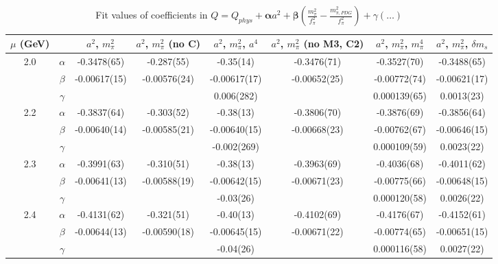 \documentclass[12pt]{extarticle}
\begin{document}
\begin{table}[h!]
\begin{center}
\begin{tabular}{|c c|c|c|c|c|c|c|}
\hline
$\mu$ (GeV) &  & $a^2$, $m_\pi^2$& $a^2$, $m_\pi^2$ (no C)& $a^2$, $m_\pi^2$, $a^4$& $a^2$, $m_\pi^2$ (no M3, C2)& $a^2$, $m_\pi^2$, $m_\pi^4$& $a^2$, $m_\pi^2$, $\delta m_s$\\
\hline
\multirow{3}{0.5in}{2.0} & $\alpha$ & -0.3478(65)& -0.287(55)& -0.35(14)& -0.3476(71)& -0.3527(70)& -0.3488(65)\\
 & $\beta$ & -0.00617(15)& -0.00576(24)& -0.00617(17)& -0.00652(25)& -0.00772(74)& -0.00621(17)\\
 & $\gamma$ &  &  & 0.006(282)&  & 0.000139(65)& 0.0013(23)\\
\hline
\multirow{3}{0.5in}{2.2} & $\alpha$ & -0.3837(64)& -0.303(52)& -0.38(13)& -0.3806(70)& -0.3876(69)& -0.3856(64)\\
 & $\beta$ & -0.00640(14)& -0.00585(21)& -0.00640(15)& -0.00668(23)& -0.00762(67)& -0.00646(15)\\
 & $\gamma$ &  &  & -0.002(269)&  & 0.000109(59)& 0.0023(22)\\
\hline
\multirow{3}{0.5in}{2.3} & $\alpha$ & -0.3991(63)& -0.310(51)& -0.38(13)& -0.3963(69)& -0.4036(68)& -0.4011(62)\\
 & $\beta$ & -0.00641(13)& -0.00588(19)& -0.00642(15)& -0.00671(23)& -0.00775(66)& -0.00648(15)\\
 & $\gamma$ &  &  & -0.03(26)&  & 0.000120(58)& 0.0026(22)\\
\hline
\multirow{3}{0.5in}{2.4} & $\alpha$ & -0.4131(62)& -0.321(51)& -0.40(13)& -0.4102(69)& -0.4176(67)& -0.4152(61)\\
 & $\beta$ & -0.00644(13)& -0.00590(18)& -0.00645(15)& -0.00671(22)& -0.00774(65)& -0.00651(15)\\
 & $\gamma$ &  &  & -0.04(26)&  & 0.000116(58)& 0.0027(22)\\
\hline
\end{tabular}
\caption{Fit values of coefficients in $Q = Q_{phys} + \mathbf{\alpha} a^2 + \mathbf{\beta}\left(\frac{m_\pi^2}{f_\pi^2}-\frac{m_{\pi,PDG}^2}{f_\pi^2}\right) + \gamma(\ldots)$}
\end{center}
\end{table}





\end{document}
